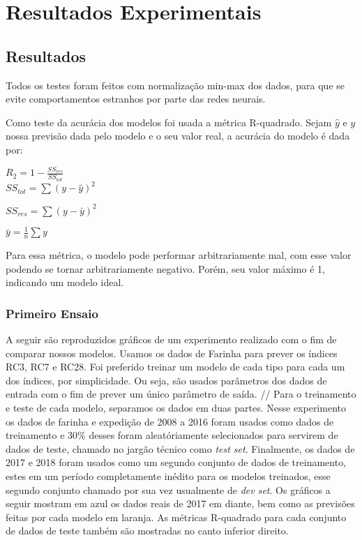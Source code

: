 \chapter{Resultados Experimentais }
\label{cap:resultados}

\section{Resultados}


Todos os testes foram feitos com normalização min-max dos dados, para que se evite comportamentos estranhos por parte das redes neurais. \\

\bigskip

Como teste da acurácia dos modelos foi usada a métrica R-quadrado. Sejam $\hat{y}$ e $y$ nossa previsão dada pelo modelo e o seu valor real, a acurácia do modelo é dada por:\\

\bigskip

\begin{center}
$R_2 = 1 - \frac{SS_{res}}{SS_{tot}}$\\

$SS_{tot} = \sum (y - \hat{y})^2$

$SS_{res} = \sum (y - \bar{y})^2$

$  \bar{y} = \frac{1}{n} \sum y$
\end{center}
\bigskip

Para essa métrica, o modelo pode performar arbitrariamente mal, com esse valor podendo se tornar arbitrariamente negativo. Porém, seu valor máximo é 1, indicando um modelo ideal.\\

\bigskip
\subsection{Primeiro Ensaio}
A seguir são reproduzidos gráficos de um experimento realizado com o fim de comparar nossos modelos. Usamos os dados de Farinha para prever os índices RC3, RC7 e RC28. Foi preferido treinar um modelo de cada tipo para cada um dos índices, por simplicidade. Ou seja, são usados parâmetros dos dados de entrada com o fim de prever um único parâmetro de saída. //
Para o treinamento e teste de cada modelo, separamos os dados em duas partes. Nesse experimento os dados de farinha e expedição de 2008 a 2016 foram usados como dados de treinamento e 30\% desses foram aleatóriamente selecionados para servirem de dados de teste, chamado no jargão técnico como \textit{test set}. Finalmente, os dados de 2017 e 2018 foram usados como um segundo conjunto de dados de treinamento, estes em um período completamente inédito para os modelos treinados, esse segundo conjunto chamado por sua vez usualmente de \textit{dev set}. Os gráficos a seguir mostram em azul os dados reais de 2017 em diante, bem como as previsões feitas por cada modelo em laranja. As métricas R-quadrado para cada conjunto de dados de teste também são mostradas no canto inferior direito.



